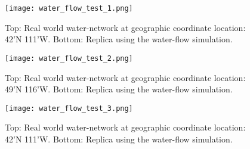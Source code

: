 \begin{figure}
\center
	\texttt{[image: water\_flow\_test\_1.png]}
	\caption{ Top: Real world water-network at geographic coordinate location: 42'N 111'W. Bottom: Replica using the water-flow simulation.}
	\label{fig:water_flow_test_1}
\end{figure}

\begin{figure}
\center
	\texttt{[image: water\_flow\_test\_2.png]}
	\caption{ Top: Real world water-network at geographic coordinate location: 49'N 116'W. Bottom: Replica using the water-flow simulation.}
	\label{fig:water_flow_test_2}
\end{figure}

\begin{figure}
\center
	\texttt{[image: water\_flow\_test\_3.png]}
	\caption{ Top: Real world water-network at geographic coordinate location: 42'N 111'W. Bottom: Replica using the water-flow simulation.}
	\label{fig:water_flow_test_3}
\end{figure}
